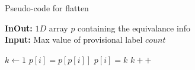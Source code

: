 \begin{algorithm}[H]
\small
{
	\caption{Pseudo-code for flatten}
	\label{alg:flatten}
	\textbf{InOut:} $1D$ array $p$ containing the equivalance info \\
	\textbf{Input:} Max value of provisional label $count$
	\begin{algorithmic}[1]
		\State $k \gets 1$
				\State $p[i] = p[p[i]]$
			\Else
				\State $p[i] = k$
				\State $k++$
			\EndIf
		\EndFor
	\EndFunction
	\end{algorithmic}	
}
\end{algorithm}
